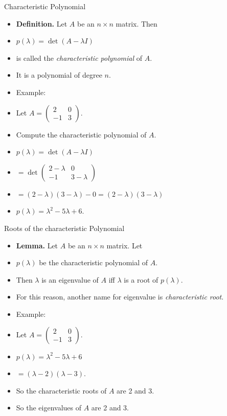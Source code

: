 \documentclass{beamer}
\begin{document}

\begin{frame}{Characteristic Polynomial}


\begin{itemize}
\item \textbf{Definition.} Let $A$ be an $n\times n$ matrix. Then
\item $p(\lambda) = \det(A-\lambda I)$
\item is called the \emph{characteristic polynomial} of $A$.
\item It is a polynomial of degree $n$.
\item Example:
\item Let $A=
\begin{pmatrix}
2 & 0 \\
-1 & 3
\end{pmatrix}
$.
\item Compute the characteristic polynomial of $A$.
\item $p(\lambda)=\det(A-\lambda I)$
\item
$
= \det
\begin{pmatrix}
2 - \lambda & 0 \\
-1 & 3 - \lambda
\end{pmatrix}
$
\item
$
= (2-\lambda)(3-\lambda) - 0 = (2-\lambda)(3-\lambda)
$
\item $p(\lambda) = \lambda^2 - 5\lambda + 6$.

\end{itemize}
\end{frame}

\begin{frame}{Roots of the characteristic Polynomial}


\begin{itemize}
\item \textbf{Lemma.} Let $A$ be an $n\times n$ matrix. Let
\item $p(\lambda)$ be the characteristic polynomial of $A$.
\item Then $\lambda$ is an eigenvalue of $A$ iff $\lambda$ is a root of $p(\lambda)$.
\item For this reason, another name for eigenvalue is \emph{characteristic root}.
\item Example:
\item Let $A=
\begin{pmatrix}
2 & 0 \\
-1 & 3
\end{pmatrix}
$.
\item $p(\lambda) = \lambda^2 - 5\lambda + 6$
\item
$
= (\lambda-2)(\lambda-3).
$
\item So the characteristic roots of $A$ are 2 and 3.
\item So the eigenvalues of $A$ are 2 and 3.
\end{itemize}
\end{frame}
\end{document}
